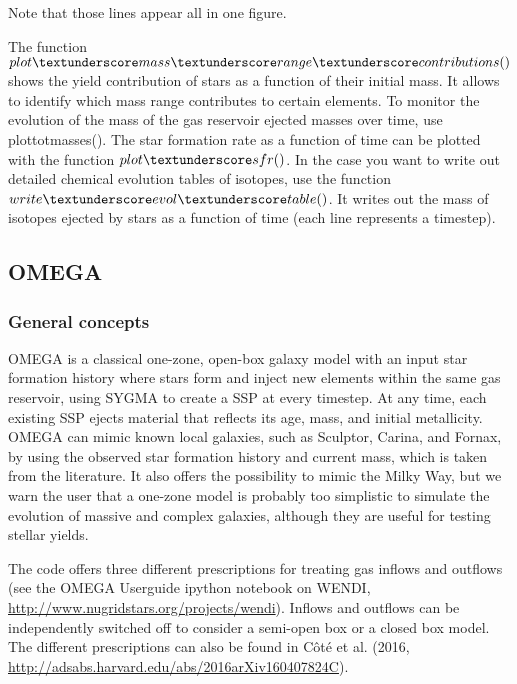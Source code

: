 Note that those lines appear all in one figure.

The function $plot\textunderscore mass\textunderscore range\textunderscore contributions()$
shows the yield contribution of stars as a function of their initial mass.
It allows to identify which mass range contributes to certain elements.
To monitor the evolution of the mass of the gas reservoir ejected
masses over time, use plot\textunderscore totmasses().
The star formation rate as a function of time can be plotted with the function $plot\textunderscore sfr()$.
In the case you want to write out detailed chemical evolution tables
of isotopes, use the function $write\textunderscore evol\textunderscore table()$.
It writes out the mass of isotopes ejected by stars as a function of time
(each line represents a timestep).

\subsection{OMEGA}

\subsubsection{General concepts}
OMEGA is a classical one-zone, open-box galaxy model with
an input star formation history where stars form and inject new elements within
the same gas reservoir, using SYGMA to create a SSP at every timestep.
At any time, each existing SSP ejects material that reflects its age, mass, and initial metallicity.
OMEGA can mimic known local galaxies, such as Sculptor, Carina, and Fornax,
by using the observed star formation history and current mass, which is taken
from the literature.  It also offers the possibility to mimic the Milky Way, but we
warn the user that a one-zone model is probably too simplistic to simulate the
evolution of massive and complex galaxies, although they are useful for testing
stellar yields.

The code offers three different prescriptions for treating gas inflows and outflows
(see the OMEGA Userguide ipython notebook on WENDI, \url{http://www.nugridstars.org/projects/wendi}).  
Inflows and outflows can be independently switched off to consider a semi-open box or a closed box model.
The different prescriptions can also be found in C\^ot\'e et al. (2016, \url{http://adsabs.harvard.edu/abs/2016arXiv160407824C}).

